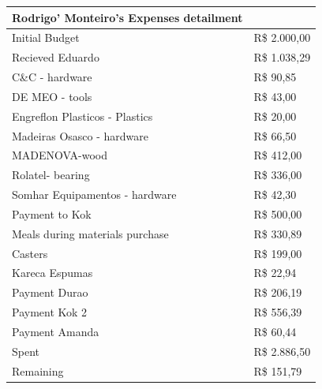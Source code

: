 \begin{tabular}{ l | l }
\hline
Rodrigo' Monteiro's Expenses detailment \\	
\hline\hline
Initial Budget &	 R\$ 2.000,00  \\	
\hline
Recieved Eduardo &	R\$ 1.038,29 \\	
C\&C - hardware &	R\$ 90,85 \\	
DE MEO - tools &	R\$ 43,00 \\	
Engreflon Plasticos - Plastics &	R\$ 20,00 \\	
Madeiras Osasco - hardware  &	R\$ 66,50 \\	
MADENOVA-wood &	R\$ 412,00 \\	
Rolatel- bearing &	R\$ 336,00 \\	
Somhar Equipamentos - hardware &	R\$ 42,30 \\	
Payment to Kok &	R\$ 500,00 \\	
Meals during materials purchase &	R\$ 330,89 \\	
Casters &	R\$ 199,00 \\	
Kareca Espumas &	R\$ 22,94 \\	
Payment Durao &	R\$ 206,19 \\	 
Payment Kok 2 &	R\$ 556,39 \\	
Payment Amanda &	R\$ 60,44 \\	
\hline \hline
Spent &	R\$ 2.886,50 \\	
\hline 
Remaining &	R\$ 151,79 \\	

\hline
\end{tabular}
\\

